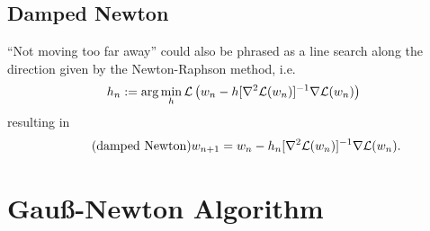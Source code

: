 \subsection{Damped Newton}\label{subsec: damped newton}

``Not moving too far away'' could also be phrased as a line search along the
direction given by the Newton-Raphson method, i.e.
\begin{align*}
	h_n := \arg\min_h \mathcal{L}\left(
		w_n - h [\nabla^2\mathcal{L}(w_n)]^{-1}\nabla\mathcal{L}(w_n)
	\right)	
\end{align*}
resulting in
\begin{align}
	\tag{damped Newton}
	w_{n+1}
	= w_n - h_n [\nabla^2\mathcal{L}(w_n)]^{-1}\nabla\mathcal{L}(w_n).
\end{align}


\section{Gauß-Newton Algorithm}

